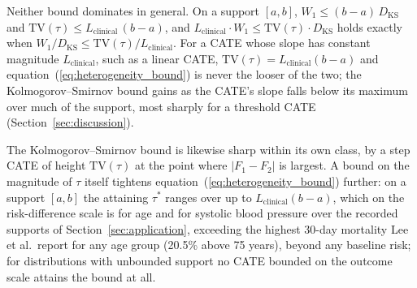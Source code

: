 \documentclass[AMA,Times1COL]{WileyNJDv5}
\begin{document}
Neither bound dominates in general. On a support $[a, b]$, $W_1 \leq (b - a)\,D_{\text{KS}}$ and $\mathrm{TV}(\tau) \leq L_{\text{clinical}}\,(b - a)$, and $L_{\text{clinical}} \cdot W_1 \leq \mathrm{TV}(\tau) \cdot D_{\text{KS}}$ holds exactly when $W_1 / D_{\text{KS}} \leq \mathrm{TV}(\tau) / L_{\text{clinical}}$. For a CATE whose slope has constant magnitude $L_{\text{clinical}}$, such as a linear CATE, $\mathrm{TV}(\tau) = L_{\text{clinical}}(b - a)$ and equation~(\ref{eq:heterogeneity_bound}) is never the looser of the two; the Kolmogorov--Smirnov bound gains as the CATE's slope falls below its maximum over much of the support, most sharply for a threshold CATE (Section~\ref{sec:discussion}).%

The Kolmogorov--Smirnov bound is likewise sharp within its own class, by a step CATE of height $\mathrm{TV}(\tau)$ at the point where $|F_1 - F_2|$ is largest. A bound on the magnitude of $\tau$ itself tightens equation~(\ref{eq:heterogeneity_bound}) further: on a support $[a, b]$ the attaining $\tau^*$ ranges over up to $L_{\text{clinical}} (b - a)$, which on the risk-difference scale is  for age and  for systolic blood pressure over the recorded supports of Section~\ref{sec:application}, exceeding the highest 30-day mortality Lee et al.\ report for any age group (20.5\% above 75 years\cite{lee1995}), beyond any baseline risk; for distributions with unbounded support no CATE bounded on the outcome scale attains the bound at all.
\end{document}
